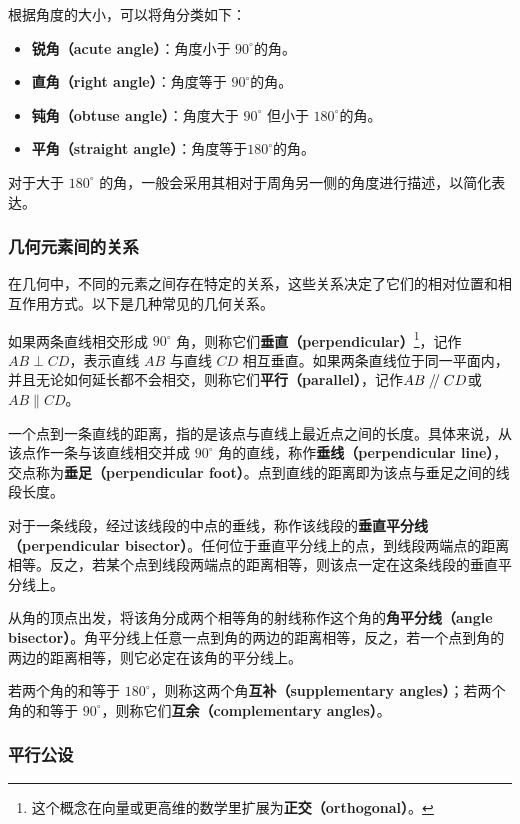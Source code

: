 根据角度的大小，可以将角分类如下：
\begin{itemize}
\item \textbf{锐角（acute angle）}：角度小于 $90^\circ$的角。
\item \textbf{直角（right angle）}：角度等于 $90^\circ$的角。
\item \textbf{钝角（obtuse angle）}：角度大于 $90^\circ$ 但小于 $180^\circ$的角。
\item \textbf{平角（straight angle）}：角度等于$180^\circ$的角。
\end{itemize}

对于大于 $180^\circ$ 的角，一般会采用其相对于周角另一侧的角度进行描述，以简化表达。

\subsubsection{几何元素间的关系}

在几何中，不同的元素之间存在特定的关系，这些关系决定了它们的相对位置和相互作用方式。以下是几种常见的几何关系。

如果两条直线相交形成 $90^\circ$ 角，则称它们\textbf{垂直（perpendicular）}\footnote{这个概念在向量或更高维的数学里扩展为\textbf{正交（orthogonal）}。}，记作 $AB \perp CD$，表示直线 $AB$ 与直线 $CD$ 相互垂直。如果两条直线位于同一平面内，并且无论如何延长都不会相交，则称它们\textbf{平行（parallel）}，记作$AB{\kern 0.56em/\kern -0.8em /\kern 0.56em}CD$或$AB \parallel CD$。

一个点到一条直线的距离，指的是该点与直线上最近点之间的长度。具体来说，从该点作一条与该直线相交并成 $90^\circ$ 角的直线，称作\textbf{垂线（perpendicular line）}，交点称为\textbf{垂足（perpendicular foot）}。点到直线的距离即为该点与垂足之间的线段长度。

对于一条线段，经过该线段的中点的垂线，称作该线段的\textbf{垂直平分线（perpendicular bisector）}。任何位于垂直平分线上的点，到线段两端点的距离相等。反之，若某个点到线段两端点的距离相等，则该点一定在这条线段的垂直平分线上。

从角的顶点出发，将该角分成两个相等角的射线称作这个角的\textbf{角平分线（angle bisector）}。角平分线上任意一点到角的两边的距离相等，反之，若一个点到角的两边的距离相等，则它必定在该角的平分线上。

若两个角的和等于 $180^\circ$，则称这两个角\textbf{互补（supplementary angles）}；若两个角的和等于 $90^\circ$，则称它们\textbf{互余（complementary angles）}。

\subsubsection{平行公设}

